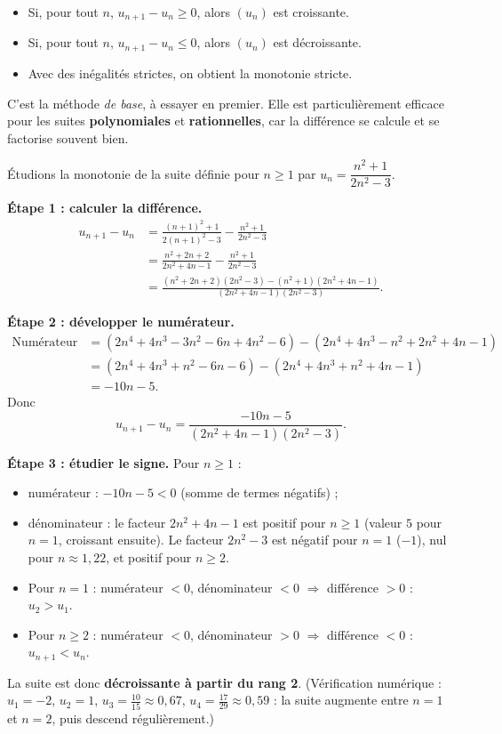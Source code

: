 \documentclass[11pt]{article}
\begin{document}
\begin{propriete}
\begin{itemize}
\item Si, pour tout $n$, $u_{n+1} - u_n \geq 0$, alors $(u_n)$ est croissante.
\item Si, pour tout $n$, $u_{n+1} - u_n \leq 0$, alors $(u_n)$ est décroissante.
\item Avec des inégalités strictes, on obtient la monotonie stricte.
\end{itemize}
\end{propriete}

C'est la méthode \emph{de base}, à essayer en premier. Elle est particulièrement efficace pour les suites \textbf{polynomiales} et \textbf{rationnelles}, car la différence se calcule et se factorise souvent bien.

\begin{exemplebox}
Étudions la monotonie de la suite définie pour $n \geq 1$ par $u_n = \dfrac{n^2+1}{2n^2-3}$.

\textbf{Étape 1 : calculer la différence.}
\begin{align*}
u_{n+1} - u_n &= \frac{(n+1)^2+1}{2(n+1)^2-3} - \frac{n^2+1}{2n^2-3} \\
&= \frac{n^2+2n+2}{2n^2+4n-1} - \frac{n^2+1}{2n^2-3} \\
&= \frac{(n^2+2n+2)(2n^2-3) - (n^2+1)(2n^2+4n-1)}{(2n^2+4n-1)(2n^2-3)}.
\end{align*}

\textbf{Étape 2 : développer le numérateur.}
\begin{align*}
\text{Numérateur} &= (2n^4 + 4n^3 - 3n^2 - 6n + 4n^2 - 6) - (2n^4 + 4n^3 - n^2 + 2n^2 + 4n - 1) \\
&= (2n^4 + 4n^3 + n^2 - 6n - 6) - (2n^4 + 4n^3 + n^2 + 4n - 1) \\
&= -10n - 5.
\end{align*}
Donc
\[ u_{n+1} - u_n = \frac{-10n - 5}{(2n^2+4n-1)(2n^2-3)}. \]

\textbf{Étape 3 : étudier le signe.} Pour $n \geq 1$ :
\begin{itemize}
\item numérateur : $-10n - 5 < 0$ (somme de termes négatifs) ;
\item dénominateur : le facteur $2n^2+4n-1$ est positif pour $n \geq 1$ (valeur $5$ pour $n=1$, croissant ensuite). Le facteur $2n^2-3$ est négatif pour $n=1$ ($-1$), nul pour $n \approx 1,22$, et positif pour $n \geq 2$.
\end{itemize}
\begin{itemize}
\item Pour $n = 1$ : numérateur $< 0$, dénominateur $< 0$ $\Rightarrow$ différence $> 0$ : $u_2 > u_1$.
\item Pour $n \geq 2$ : numérateur $< 0$, dénominateur $> 0$ $\Rightarrow$ différence $< 0$ : $u_{n+1} < u_n$.
\end{itemize}
La suite est donc \textbf{décroissante à partir du rang 2}. (Vérification numérique : $u_1 = -2$, $u_2 = 1$, $u_3 = \tfrac{10}{15} \approx 0{,}67$, $u_4 = \tfrac{17}{29} \approx 0{,}59$ : la suite augmente entre $n=1$ et $n=2$, puis descend régulièrement.)
\end{exemplebox}
\end{document}
